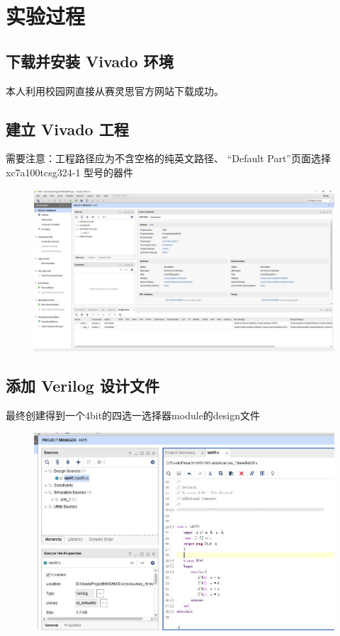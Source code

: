 \documentclass[UTF8]{article}
\begin{document}
	\section{实验过程}
	\subsection{下载并安装 Vivado 环境}
	本人利用校园网直接从赛灵思官方网站下载成功。
	
	\subsection{建立 Vivado 工程}
	需要注意：工程路径应为不含空格的纯英文路径、 “Default Part”页面选择 xc7a100tcsg324-1 型号的器件\par
	\begin{figure}[H]
		\centering
		\includegraphics[width=1\linewidth]{s2.jpg}
		\label{s2}
	\end{figure}

	\subsection{添加 Verilog 设计文件}
	最终创建得到一个4bit的四选一选择器module的design文件\par
	\begin{figure}[H]
		\centering
		\includegraphics[width=1\linewidth]{s3.jpg}
		\label{s3}
	\end{figure}
\end{document}
